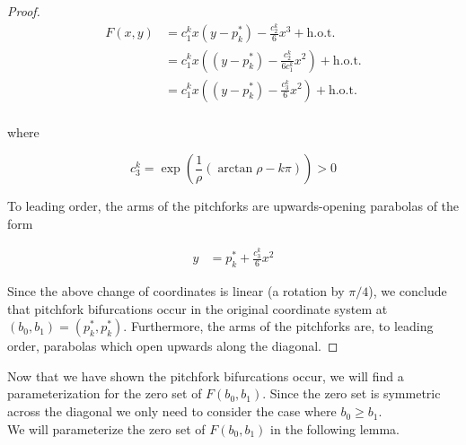\documentclass[thesis.tex]{subfiles}
\begin{document}
\begin{lemma}
\begin{proof}
\begin{align*}
F(x, y) &= c_1^k x (y - p_k^*) - \frac{c_2^k}{6} x^3 + \text{h.o.t.} \\
&= c_1^k x \left( (y - p_k^*) - \frac{c_2^k}{6 c_1^k } x^2 \right) + \text{h.o.t.} \\
&= c_1^k x \left( (y - p_k^*) - \frac{c_3^k}{6} x^2 \right) + \text{h.o.t.} \\
\end{align*}

where

\begin{equation*}
c_3^k = \exp{\left(\frac{1}{\rho} (\arctan \rho - k \pi) \right)} > 0
\end{equation*}

To leading order, the arms of the pitchforks are upwards-opening parabolas of the form 

\begin{align*}
y &= p_k^* + \frac{c_3^k}{6} x^2
\end{align*}

Since the above change of coordinates is linear (a rotation by $\pi/4$), we conclude that pitchfork bifurcations occur in the original coordinate system at $(b_0, b_1) = (p_k^*, p_k^*)$. Furthermore, the arms of the pitchforks are, to leading order, parabolas which open upwards along the diagonal.

\end{proof}
\end{lemma}

Now that we have shown the pitchfork bifurcations occur, we will find a parameterization for the zero set of $F(b_0, b_1)$. Since the zero set is symmetric across the diagonal we only need to consider the case where $b_0 \geq b_1$.\\

We will parameterize the zero set of $F(b_0, b_1)$ in the following lemma.

\end{document}
